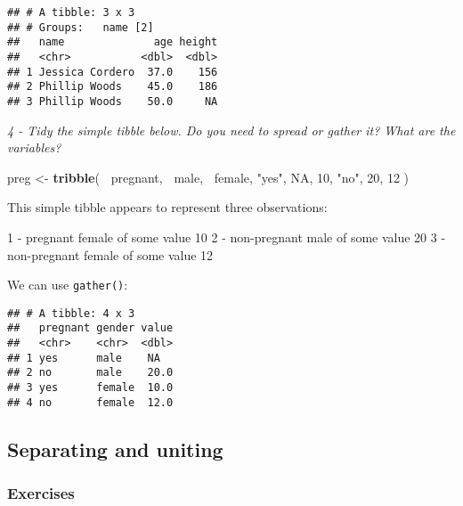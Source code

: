 \documentclass[]{article}
\newenvironment{Shaded}{\begin{snugshade}}{\end{snugshade}}
\newcommand{\KeywordTok}[1]{\textcolor[rgb]{0.13,0.29,0.53}{\textbf{#1}}}
\newcommand{\DataTypeTok}[1]{\textcolor[rgb]{0.13,0.29,0.53}{#1}}
\newcommand{\DecValTok}[1]{\textcolor[rgb]{0.00,0.00,0.81}{#1}}
\newcommand{\StringTok}[1]{\textcolor[rgb]{0.31,0.60,0.02}{#1}}
\newcommand{\OtherTok}[1]{\textcolor[rgb]{0.56,0.35,0.01}{#1}}
\newcommand{\OperatorTok}[1]{\textcolor[rgb]{0.81,0.36,0.00}{\textbf{#1}}}
\newcommand{\NormalTok}[1]{#1}
\theoremstyle{definition}
\theoremstyle{definition}
\theoremstyle{definition}
\theoremstyle{remark}
\begin{document}
\begin{verbatim}
## # A tibble: 3 x 3
## # Groups:   name [2]
##   name              age height
##   <chr>           <dbl>  <dbl>
## 1 Jessica Cordero  37.0    156
## 2 Phillip Woods    45.0    186
## 3 Phillip Woods    50.0     NA
\end{verbatim}

\emph{4 - Tidy the simple tibble below. Do you need to spread or gather
it? What are the variables?}

\begin{Shaded}
\begin{Highlighting}[]
\NormalTok{preg <-}\StringTok{ }\KeywordTok{tribble}\NormalTok{(}
  \OperatorTok{~}\NormalTok{pregnant, }\OperatorTok{~}\NormalTok{male, }\OperatorTok{~}\NormalTok{female,}
  \StringTok{"yes"}\NormalTok{,     }\OtherTok{NA}\NormalTok{,    }\DecValTok{10}\NormalTok{,}
  \StringTok{"no"}\NormalTok{,      }\DecValTok{20}\NormalTok{,    }\DecValTok{12}
\NormalTok{)}
\end{Highlighting}
\end{Shaded}

This simple tibble appears to represent three observations:

1 - pregnant female of some value 10 2 - non-pregnant male of some value
20 3 - non-pregnant female of some value 12

We can use \texttt{gather()}:

\begin{Shaded}
\end{Shaded}

\begin{verbatim}
## # A tibble: 4 x 3
##   pregnant gender value
##   <chr>    <chr>  <dbl>
## 1 yes      male    NA  
## 2 no       male    20.0
## 3 yes      female  10.0
## 4 no       female  12.0
\end{verbatim}

\subsection{Separating and uniting}\label{separating-and-uniting}

\subsubsection{Exercises}\label{exercises-23}
\end{document}
